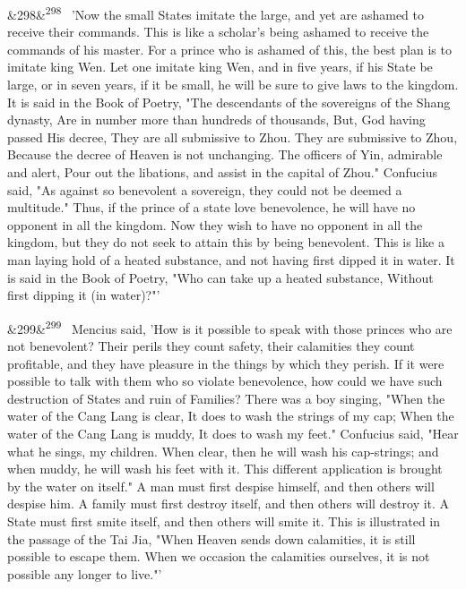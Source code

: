\documentclass[12pt]{article}
\newcommand{\para}[1][]{\par\noindent\ifx&#1&\else\textsuperscript{\footnotesize #1}~\fi}
\begin{document}
\para[298] 'Now the small States imitate the large, and yet are ashamed to receive their commands. This is like a scholar's being ashamed to receive the commands of his master. For a prince who is ashamed of this, the best plan is to imitate king Wen. Let one imitate king Wen, and in five years, if his State be large, or in seven years, if it be small, he will be sure to give laws to the kingdom. It is said in the Book of Poetry, "The descendants of the sovereigns of the Shang dynasty, Are in number more than hundreds of thousands, But, God having passed His decree, They are all submissive to Zhou. They are submissive to Zhou, Because the decree of Heaven is not unchanging. The officers of Yin, admirable and alert, Pour out the libations, and assist in the capital of Zhou." Confucius said, "As against so benevolent a sovereign, they could not be deemed a multitude." Thus, if the prince of a state love benevolence, he will have no opponent in all the kingdom. Now they wish to have no opponent in all the kingdom, but they do not seek to attain this by being benevolent. This is like a man laying hold of a heated substance, and not having first dipped it in water. It is said in the Book of Poetry, "Who can take up a heated substance, Without first dipping it (in water)?"'

\para[299] Mencius said, 'How is it possible to speak with those princes who are not benevolent? Their perils they count safety, their calamities they count profitable, and they have pleasure in the things by which they perish. If it were possible to talk with them who so violate benevolence, how could we have such destruction of States and ruin of Families? There was a boy singing, "When the water of the Cang Lang is clear, It does to wash the strings of my cap; When the water of the Cang Lang is muddy, It does to wash my feet." Confucius said, "Hear what he sings, my children. When clear, then he will wash his cap-strings; and when muddy, he will wash his feet with it. This different application is brought by the water on itself." A man must first despise himself, and then others will despise him. A family must first destroy itself, and then others will destroy it. A State must first smite itself, and then others will smite it. This is illustrated in the passage of the Tai Jia, "When Heaven sends down calamities, it is still possible to escape them. When we occasion the calamities ourselves, it is not possible any longer to live."'
\end{document}
